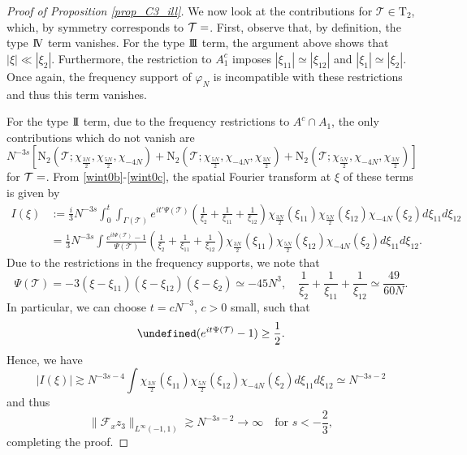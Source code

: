 \documentclass[%
11pt,  reqno]{amsart}
\makeatletter
\newcommand{\II}{\textup{I \hspace{-2.9mm} I} }
\newcommand{\III}{\textup{I \hspace{-2.9mm} I \hspace{-2.9mm} I}}
\newcommand{\IV}{\textup{I \hspace{-2.9mm} V}}
\newcommand{\5}{\textup{V}}
\newcommand{\F}{\mathcal{F}}
\theoremstyle{remark}
\let\Re=\undefined\DeclareMathOperator*{\Re}{Re}
\newcommand{\TT}{\mathcal{T}}
\newcommand{\Tr}{\mathrm{T}}
\newcommand{\G}{\Gamma}
\def\<#1>{\csname MH@symb@#1\endcsname}
\numberwithin{equation}{section}
\numberwithin{theorem}{section}
\newcommand{\NN}{\mathrm{N}}
\makeatother
\begin{document}
\begin{proof}[Proof of Proposition \ref{prop_C3_ill}]
    

    
    

    We now look at the contributions for $\TT\in\Tr_2$, which, by symmetry corresponds to $\TT=\<21>$. First, observe that, by definition, the type $\IV$ term vanishes. For the type $\III$ term, the argument above shows that $|\xi|\ll |\xi_2|$. Furthermore, the restriction to $A_1^c$ imposes $|\xi_{11}|\simeq |\xi_{12}|$ and $|\xi_1|\simeq |\xi_2|$. Once again, the frequency support of $\varphi_N$ is incompatible with these restrictions and thus this term vanishes. 
     
    For the type $\II$ term, due to the frequency restrictions to $A^c \cap A_1$, the only contributions which do not vanish are
    $$
    N^{-3s}\left[\NN_2\left(\TT; \chi_{\frac{3N}2}, \chi_{\frac{5N}2}, \chi_{-4N}\right) + \NN_2\left(\TT; \chi_{\frac{5N}2}, \chi_{-4N}, \chi_{\frac{3N}2}\right)+\NN_2\left(\TT; \chi_{\frac{5N}2}, \chi_{-4N}, \chi_{\frac{3N}2}\right)\right]
    $$
    for $\TT=\<21>$.  From \eqref{wint0b}-\eqref{wint0c}, the spatial Fourier transform at $\xi$ of these terms is given by
    \begin{align}
        I(\xi)& := \tfrac{i}{3} N^{-3s}\int_0^t
        \int_{\G(\TT)} e^{it'\Psi(\TT)}\left(\frac{1}{\xi_2} + \frac{1}{\xi_{11}}  + \frac{1}{\xi_{12}} \right)\chi_{\frac{3N}2}(\xi_{11})\chi_{\frac{5N}2}(\xi_{12})\chi_{-4N}(\xi_{2})d\xi_{11}d\xi_{12} \\
        & = 
        \tfrac{1}{3}
        N^{-3s}\int \frac{e^{it\Psi(\TT)}-1}{\Psi(\TT)}\left(\frac{1}{\xi_2} + \frac{1}{\xi_{11}}  + \frac{1}{\xi_{12}} \right)\chi_{\frac{3N}2}(\xi_{11})\chi_{\frac{5N}2}(\xi_{12})\chi_{-4N}(\xi_{2})d\xi_{11}d\xi_{12} 
        .
    \end{align}
    Due to the restrictions in the frequency supports, we note that
    $$
     \Psi(\TT)=-3(\xi-\xi_{11})(\xi-\xi_{12})(\xi-\xi_{2}) \simeq -45N^3,\quad \frac{1}{\xi_2} + \frac{1}{\xi_{11}}  + \frac{1}{\xi_{12}} \simeq \frac{49}{60N}. 
    $$
    In particular, we can choose $t=cN^{-3}$, $c>0$ small, such that
    $$
    \Re (e^{it\Psi(\TT)}-1) \ge \frac12.
    $$
    Hence, we have
    $$
    |I(\xi)|\gtrsim N^{-3s-4}\int \chi_{\frac{3N}2}(\xi_{11})\chi_{\frac{5N}2}(\xi_{12})\chi_{-4N}(\xi_{2})d\xi_{11}d\xi_{12}  \simeq N^{-3s-2}
    $$
    and thus
    $$
    \|\F_xz_3\|_{L^{\infty}(-1,1)}\gtrsim N^{-3s-2}\to \infty\quad \mbox{for }s<-\frac{2}{3}, 
    $$
    completing the proof. \qedhere

\end{proof}
\end{document}
